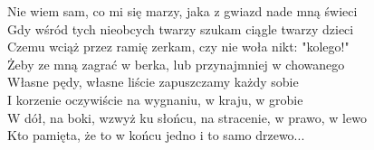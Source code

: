 \begin{flushleft}
\vskip 3mm
Nie wiem sam, co mi się marzy, jaka z gwiazd nade mną świeci \\
Gdy wśród tych nieobcych twarzy szukam ciągle twarzy dzieci \\
Czemu wciąż przez ramię zerkam, czy nie woła nikt: "kolego!" \\
Żeby ze mną zagrać w berka, lub przynajmniej w chowanego \\
\vskip 3mm
Własne pędy, własne liście zapuszczamy każdy sobie \\
I korzenie oczywiście na wygnaniu, w kraju, w grobie \\
W dół, na boki, wzwyż ku słońcu, na stracenie, w prawo, w lewo \\
Kto pamięta, że to w końcu jedno i to samo drzewo...  \\
\end{flushleft}
\clearpage
